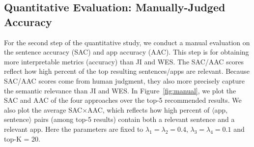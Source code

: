 \subsection{Quantitative Evaluation: Manually-Judged Accuracy}
\label{sec:manual}


For the second step of the quantitative study, we conduct a manual evaluation on the sentence accuracy (SAC) and app accuracy (AAC). 
This step is for obtaining more interpretable metrics (accuracy) than JI and WES. 
The SAC/AAC scores reflect how high percent of the top resulting sentences/apps are relevant. 
Because SAC/AAC scores come from human judgment, they also more precisely capture the semantic relevance than JI and WES. 
In Figure~\ref{fig:manual}, we plot the SAC and AAC of the four approaches over the top-5 recommended results. 
We also plot the average SAC$\times$AAC, which reflects how high percent of $\langle$app, sentence$\rangle$ pairs (among top-5 results) contain both a relevant sentence and a relevant app. 
Here the parameters are fixed to $\lambda_1=\lambda_2=0.4$, $\lambda_3=\lambda_4=0.1$ and top-K = 20.  


